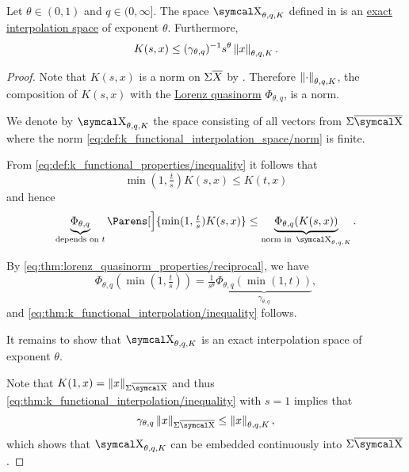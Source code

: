 \begin{theorem}\label{thm:k_functional_interpolation}
  Let \( \theta \in (0, 1) \) and \( q \in (0, \infty] \). The space \( \CX_{\theta,q,K} \) defined in  is an \hyperref[thm:banach_interpolation_space_exponent]{exact interpolation space} of exponent \( \theta \). Furthermore,
  \begin{equation}\label{eq:thm:k_functional_interpolation/inequality}
    K(s, x) \leq (\gamma_{\theta,q})^{-1} s^\theta \left\Vert x \right\Vert_{\theta,q,K}.
  \end{equation}
\end{theorem}
\begin{proof}
  Note that \( K(s, x) \) is a norm on \( \Sigma \overline{X} \) by . Therefore \( \left\Vert \cdot \right\Vert_{\theta,q,K} \), the composition of \( K(s, x) \) with the \hyperref[def:lorenz_quasinorm]{Lorenz quasinorm} \( \Phi_{\theta,q} \), is a norm.

  We denote by \( \CX_{\theta,q,K} \) the space consisting of all vectors from \( \Sigma \Ol{\CX} \) where the norm \eqref{eq:def:k_functional_interpolation_space/norm} is finite.

  From \eqref{eq:def:k_functional_properties/inequality} it follows that
  \begin{equation*}
    \min(1, \tfrac t s) K(s, x) \leq K(t, x)
  \end{equation*}
  and hence
  \begin{equation*}
    \underbrace{\Phi_{\theta,q}}_{\text{depends on } t} \Parens[\Big]{ \min(1, \tfrac t s) K(s, x) } \leq \underbrace{\Phi_{\theta,q}(K(s, x))}_{\text{norm in } \CX_{\theta,q,K}}.
  \end{equation*}

  By \eqref{eq:thm:lorenz_quasinorm_properties/reciprocal}, we have
  \begin{equation*}
    \Phi_{\theta,q}(\min(1, \tfrac t s)) = \tfrac 1 {s^\theta} \underbrace{\Phi_{\theta,q}(\min(1, t))}_{\hyperref[eq:def:lorenz_quasinorm/gamma]{\gamma_{\theta,q}}},
  \end{equation*}
  and \eqref{eq:thm:k_functional_interpolation/inequality} follows.

  It remains to show that \( \CX_{\theta,q,K} \) is an exact interpolation space of exponent \( \theta \).

  Note that \( K(1, x) = \Norm{x}_{\Sigma \Ol{\CX}} \) and thus \eqref{eq:thm:k_functional_interpolation/inequality} with \( s = 1 \) implies that
  \begin{equation*}
    \gamma_{\theta,q} \Norm{x}_{\Sigma \Ol{\CX}} \leq \Norm{x}_{\theta,q,K},
  \end{equation*}
  which shows that \( \CX_{\theta,q,K} \) can be embedded continuously into \( \Sigma \Ol{\CX} \).


\end{proof}
